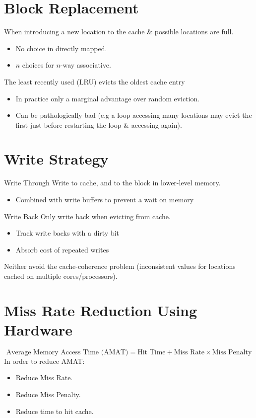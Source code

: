 \section{Block Replacement}
When introducing a new location to the cache \& possible locations are full.
\begin{itemize}
    \item No choice in directly mapped.
    \item $n$ choices for $n$-way associative.
\end{itemize}
The least recently used (LRU) evicts the oldest cache entry
\begin{itemize}
    \item In practice only a marginal advantage over random eviction.
    \item Can be pathologically bad (e.g a loop accessing many locations may evict the first just before restarting the loop \& accessing again).
\end{itemize}

\section{Write Strategy}
\begin{tcbraster}[raster columns=2, raster equal height]
    \begin{definitionbox}{Write Through}
        Write to cache, and to the block in lower-level memory.
        \begin{itemize}
            \item Combined with write buffers to prevent a wait on memory
        \end{itemize}
    \end{definitionbox}
    \begin{definitionbox}{Write Back}
        Only write back when evicting from cache. 
        \begin{itemize}
            \item Track write backs with a dirty bit
            \item Absorb cost of repeated writes
        \end{itemize}
    \end{definitionbox}
\end{tcbraster}
Neither avoid the cache-coherence problem (inconsistent values for locations cached on multiple cores/processors).

\section{Miss Rate Reduction Using Hardware}
\[\text{Average Memory Access Time (AMAT)} = \text{Hit Time} + \text{Miss Rate} \times \text{Miss Penalty}\]
In order to reduce AMAT:
\begin{itemize}
    \item Reduce Miss Rate.
    \item Reduce Miss Penalty.
    \item Reduce time to hit cache.
\end{itemize}

